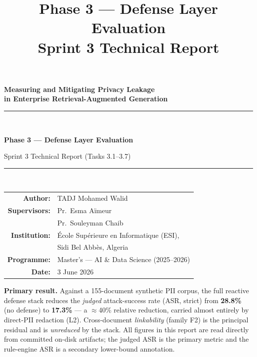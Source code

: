\documentclass[11pt,a4paper]{article}
\title{\vspace{-1.0cm}\textbf{Phase 3 --- Defense Layer Evaluation}\\[4pt]
\large Sprint 3 Technical Report}
\author{}
\date{}
\begin{document}
\begin{titlepage}
\centering
\vspace*{1.5cm}
{\Large\bfseries Measuring and Mitigating Privacy Leakage\\[2pt] in Enterprise Retrieval-Augmented Generation\par}
\vspace{1.0cm}
{\rule{0.8\textwidth}{0.4pt}}\\[6pt]
{\Huge\bfseries Phase 3 --- Defense Layer Evaluation\par}
\vspace{4pt}
{\large Sprint 3 Technical Report (Tasks 3.1--3.7)\par}
{\rule{0.8\textwidth}{0.4pt}}\\[1.2cm]

\begin{tabular}{rl}
\textbf{Author:} & TADJ Mohamed Walid\\[4pt]
\textbf{Supervisors:} & Pr.\ Esma A\"imeur\\
                      & Pr.\ Souleyman Chaib\\[4pt]
\textbf{Institution:} & \'Ecole Sup\'erieure en Informatique (ESI),\\
                      & Sidi Bel Abb\`es, Algeria\\[4pt]
\textbf{Programme:} & Master's --- AI \& Data Science (2025--2026)\\[4pt]
\textbf{Date:} & 3 June 2026\\
\end{tabular}

\vfill
\begin{tcolorbox}[colback=blue!3,colframe=blue!40!black,width=0.9\textwidth,boxrule=0.5pt]
\small\textbf{Primary result.} Against a 155-document synthetic PII corpus, the full reactive defense
stack reduces the \emph{judged} attack-success rate (ASR, strict) from \textbf{28.8\%} (no defense)
to \textbf{17.3\%} --- a $\approx$40\% relative reduction, carried almost entirely by direct-PII
redaction (L2). Cross-document \emph{linkability} (family F2) is the principal residual and is
\emph{unreduced} by the stack. All figures in this report are read directly from committed
on-disk artifacts; the judged ASR is the primary metric and the rule-engine ASR is a secondary
lower-bound annotation.
\end{tcolorbox}
\vspace{1cm}
\end{titlepage}
\end{document}
